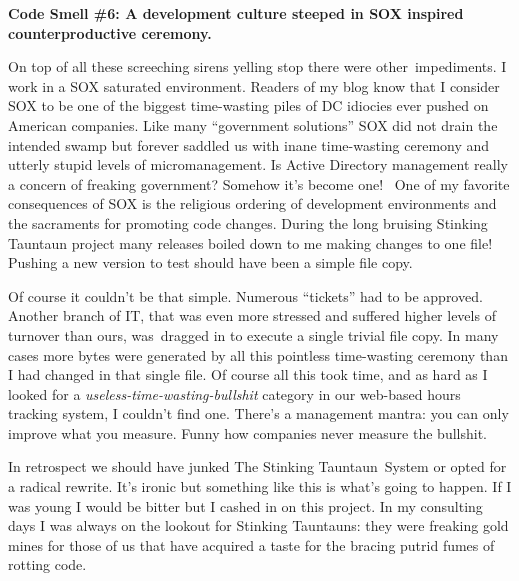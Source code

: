 \medskip
\noindent\textbf{Code Smell \#6: A development culture steeped in
SOX inspired counterproductive ceremony.}
\medskip

On top of all these screeching sirens yelling stop there were
other~impediments. I work in a SOX saturated environment. Readers of my
blog know that I consider SOX to be one of the biggest time-wasting
piles of DC idiocies ever pushed on American companies. Like many
``government solutions'' SOX did not drain the intended swamp but
forever saddled us with inane time-wasting ceremony and utterly stupid
levels of micromanagement. Is Active Directory management really a
concern of freaking government? Somehow it's become one!~ One of my
favorite consequences of SOX is the religious ordering of development
environments and the sacraments for promoting code changes. During the
long bruising Stinking Tauntaun project many releases boiled down to me
making changes to one file! Pushing a new version to test should have
been a simple file copy.

Of course it couldn't be that simple. Numerous ``tickets'' had to be
approved. Another branch of IT, that was even more stressed and suffered
higher levels of turnover than ours, was~dragged in to execute a single
trivial file copy. In many cases more bytes were generated by all this
pointless time-wasting ceremony than I had changed in that single file.
Of course all this took time, and as hard as I looked for a
\emph{useless-time-wasting-bullshit} category in our web-based hours
tracking system, I couldn't find one. There's a management mantra: you
can only improve what you measure. Funny how companies never measure
the bullshit.

In retrospect we should have junked The Stinking Tauntaun~System or
opted for a radical rewrite. It's ironic but something like this is
what's going to happen. If I was young I would be bitter but I cashed in
on this project. In my consulting days I was always on the lookout for
Stinking Tauntauns: they were freaking gold mines for those of us that
have acquired a taste for the bracing putrid fumes of rotting code.






%